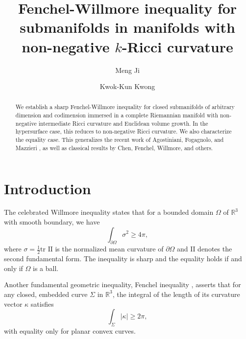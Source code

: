 \documentclass[11pt, reqno]{amsart}
\numberwithin{equation}{section}
\begin{document}
\title[Fenchel-Willmore inequality for submanifolds]{Fenchel-Willmore inequality for submanifolds in manifolds with non-negative $k$-Ricci curvature}

\author[M. Ji]{Meng Ji}
\address{School of Mathematics and Applied Statistics,
University of Wollongong\\
NSW 2522, Australia}

\author[K.-K. Kwong]{Kwok-Kun Kwong}
\address{School of Mathematics and Applied Statistics,
University of Wollongong\\
NSW 2522, Australia}


\begin{abstract}
We establish a sharp Fenchel-Willmore inequality for closed submanifolds of arbitrary dimension and codimension immersed in a complete Riemannian manifold with non-negative intermediate Ricci curvature and Euclidean volume growth. In the hypersurface case, this reduces to non-negative Ricci curvature. We also characterize the equality case. This generalizes the recent work of Agostiniani, Fogagnolo, and Mazzieri \cite{Agostiniani-Fogagnolo-Mazzieri}, as well as classical results by Chen, Fenchel, Willmore, and others.
\end{abstract}
\maketitle

\section{Introduction}\label{sec intro}
The celebrated Willmore inequality \cite{Willmore68} states that for a bounded domain $\Omega$ of $\mathbb{R}^3$ with smooth boundary, we have
$$
\int_{\partial \Omega} \sigma^2 \ge 4\pi,
$$
where $\sigma=\frac{1}{2}\text{tr }\mathrm{II}$ is the normalized mean curvature of $\partial \Omega$ and $\mathrm{II}$ denotes the second fundamental form.
The inequality is sharp and the equality holds if and only if $\Omega$ is a ball.

Another fundamental geometric inequality, Fenchel inequality \cite{Fenchel29}, asserts that for any closed, embedded curve $\Sigma$ in $\mathbb R^3$, the integral of the length of its curvature vector $\kappa$ satisfies
$$\int_{\Sigma}|\kappa|\ge 2\pi, $$
with equality only for planar convex curves.
\end{document}
